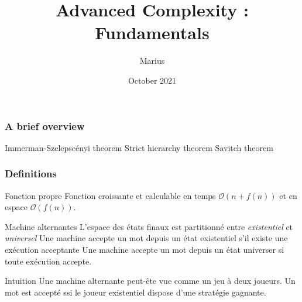 \documentclass[pdf]{beamer}
\title{Advanced Complexity : Fundamentals}
\author{Marius}
\date{October 2021}
\renewcommand{\O}{\mathcal{O}}
\begin{document}
\maketitle
\begin{frame}
\frametitle{A brief overview}

 

\bigskip
\color{blue} Immerman-Szelepscényi theorem \newline
\color{olive} Strict hierarchy theorem \newline
\color{purple} Savitch theorem \newline


\end{frame}

\begin{frame}
\frametitle{Definitions}

\begin{block}{Fonction propre}
Fonction croissante et calculable en temps $\O(n+f(n))$ et en espace $\O(f(n))$.
\end{block}


\begin{block}{Machine alternantes}
L'espace des états finaux est partitionné entre \emph{existentiel} et \emph{universel}\newline
Une machine accepte un mot depuis un état existentiel s'il existe une exécution acceptante \newline
Une machine accepte un mot depuis un état universer si toute exécution accepte.\newline
\end{block}


\begin{exampleblock}{Intuition}
Une machine alternante peut-ête vue comme un jeu à deux joueurs. \newline
Un mot est accepté ssi le joueur existentiel dispose d'une stratégie gagnante.
\end{exampleblock}
\end{frame}
\end{document}
